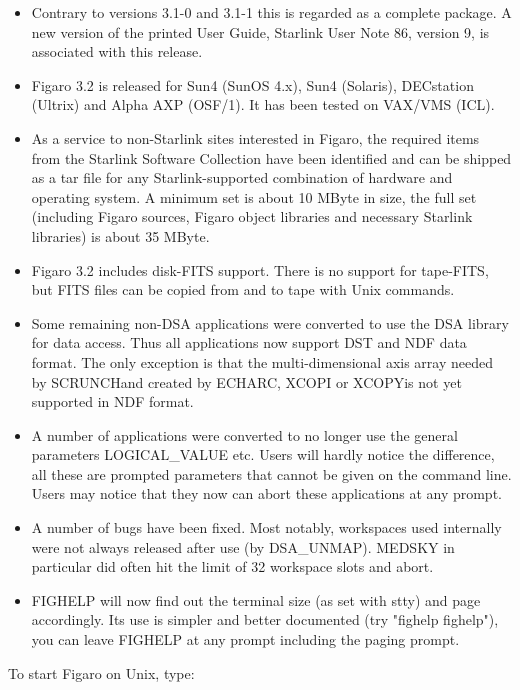 \begin{itemize}
\item
   Contrary to versions 3.1-0 and 3.1-1 this is regarded as a complete
   package.  A new version of the printed User Guide, Starlink User
   Note 86, version 9, is associated with this release.
\item
   Figaro 3.2 is released for Sun4 (SunOS 4.x), Sun4 (Solaris),
   DECstation (Ultrix) and Alpha AXP (OSF/1).  It has been tested on
   VAX/VMS (ICL).
\item
   As a service to non-Starlink sites interested in Figaro, the required
   items from the Starlink Software Collection have been identified and
   can be shipped as a tar file for any Starlink-supported combination
   of hardware and operating system.  A minimum set is about 10 MByte in
   size, the full set (including Figaro sources, Figaro object libraries
   and necessary Starlink libraries) is about 35 MByte.
\item
   Figaro 3.2 includes disk-FITS support.  There is no support for
   tape-FITS, but FITS files can be copied from and to tape with Unix
   commands.
\item
   Some remaining non-DSA applications were converted to use the DSA
   library for data access.  Thus all applications now support DST and
   NDF data format.  The only exception is that the multi-dimensional
   axis array needed by SCRUNCH\latorhtm{---}{-}and created by ECHARC,
   XCOPI or XCOPY\latorhtm{---}{-}is not yet supported in NDF format.
\item
   A number of applications were converted to no longer use the general
   parameters LOGICAL\_VALUE etc.  Users will hardly notice the
   difference, all these are prompted parameters that cannot be given on
   the command line.  Users may notice that they now can abort these
   applications at any prompt.
\item
   A number of bugs have been fixed.  Most notably, workspaces used
   internally were not always released after use (by DSA\_UNMAP).  MEDSKY
   in particular did often hit the limit of 32 workspace slots and
   abort.
\item
   FIGHELP will now find out the terminal size (as set with stty) and
   page accordingly.  Its use is simpler and better documented (try
   "fighelp fighelp"), you can leave FIGHELP at any prompt including the
   paging prompt.
\end{itemize}

   To start Figaro on Unix, type:

